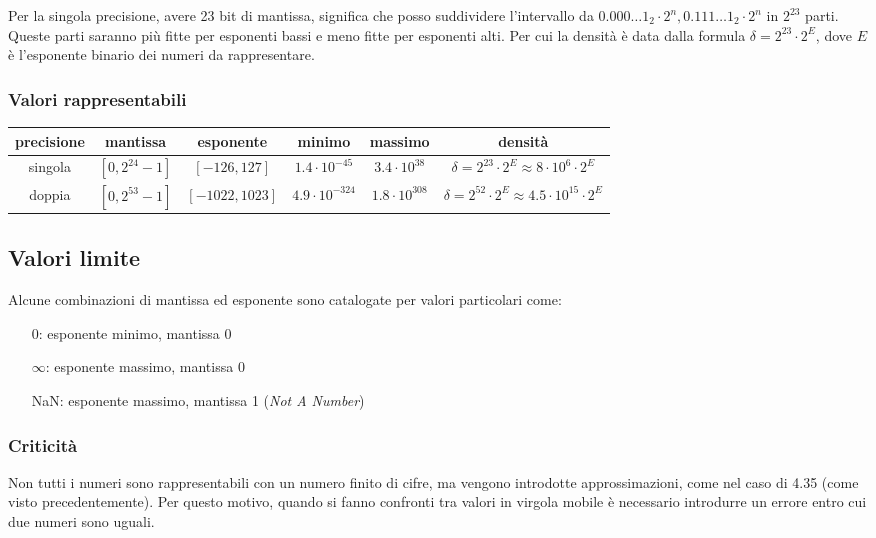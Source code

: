 \documentclass{article}
\begin{document}
Per la singola precisione, avere 23 bit di mantissa, significa che posso suddividere l'intervallo da \(0.000\dots1_2 \cdot 2^n,0.111\dots1_2 \cdot 2^n\)
in \(2^{23}\) parti. Queste parti saranno più fitte per esponenti bassi e meno fitte per esponenti alti. Per cui la densità
è data dalla formula \(\delta = 2^{23} \cdot 2^E\), dove \(E\) è l'esponente binario dei numeri da rappresentare.


\subsubsection*{Valori rappresentabili}
\begin{center}
	\begin{tabular}{c c c c c c}
		\textbf{precisione} & \textbf{mantissa} & \textbf{esponente} & \textbf{minimo} & \textbf{massimo} & \textbf{densità} \\
		\toprule
		singola & \(\left[0, 2^{24} - 1\right]\) & \(\left[-126, 127\right]\) & \(1.4 \cdot 10^{-45}\) & \(3.4 \cdot 10^{38}\) & \(\delta = 2^{23} \cdot 2^E \approx 8 \cdot 10^6 \cdot 2^E\) \\
		\midrule
		doppia & \(\left[0, 2^{53} - 1\right]\) & \(\left[-1022, 1023\right]\) & \(4.9 \cdot 10^{-324}\) & \(1.8 \cdot 10^{308}\) & \(\delta = 2^{52} \cdot 2^E \approx 4.5 \cdot 10^{15} \cdot 2^E\) \\
		\bottomrule
	\end{tabular}
\end{center}

\subsection*{Valori limite}
Alcune combinazioni di mantissa ed esponente sono catalogate per valori particolari come:
\begin{itemize} [topsep=3pt, itemsep=0pt]
	\item[\(0\): ] esponente minimo, mantissa 0
	\item[\(\infty\): ] esponente massimo, mantissa 0
	\item[NaN: ] esponente massimo, mantissa 1 (\textit{Not A Number}) 
\end{itemize}

\subsubsection*{Criticità}
Non tutti i numeri sono rappresentabili con un numero finito di cifre, ma vengono introdotte approssimazioni, come nel
caso di 4.35 (come visto precedentemente). Per questo motivo, quando si fanno confronti tra valori in virgola mobile è
necessario introdurre un errore entro cui due numeri sono uguali.
\end{document}
